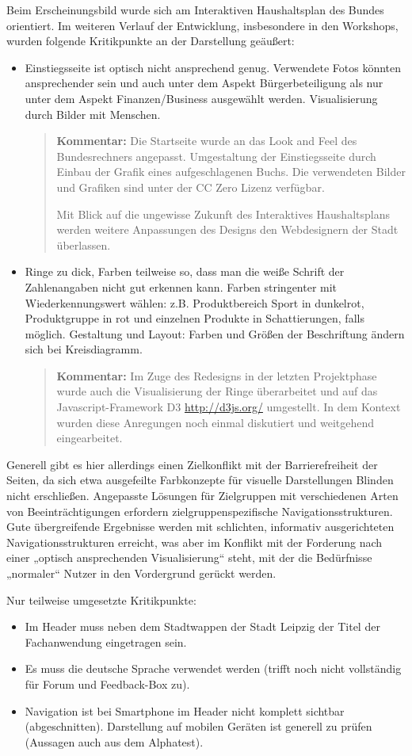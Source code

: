 \documentclass[11pt,a4paper,twoside]{article}
\newcommand{\kommentar}[1]{\begin{quote}\textbf{Kommentar:} #1 \end{quote}}
\begin{document}
Beim Erscheinungsbild wurde sich am Interaktiven Haushaltsplan des Bundes
orientiert. Im weiteren Verlauf der Entwicklung, insbesondere in den
Workshops, wurden folgende Kritikpunkte an der Darstellung geäußert:
\begin{itemize}\itemsep0pt
\item Einstiegsseite ist optisch nicht ansprechend genug.  Verwendete Fotos
  könnten ansprechender sein und auch unter dem Aspekt Bürgerbeteiligung als
  nur unter dem Aspekt Finanzen/Business ausgewählt werden.  Visualisierung
  durch Bilder mit Menschen. 

\kommentar{Die Startseite wurde an das Look and Feel des Bundesrechners
  angepasst. Umgestaltung der Einstiegsseite durch Einbau der Grafik eines
  aufgeschlagenen Buchs.  Die verwendeten Bilder und Grafiken sind unter der
  CC Zero Lizenz verfügbar.

  Mit Blick auf die ungewisse Zukunft des Interaktives Haushaltsplans werden
  weitere Anpassungen des Designs den Webdesignern der Stadt überlassen. }

\item Ringe zu dick, Farben teilweise so, dass man die weiße Schrift der
  Zahlenangaben nicht gut erkennen kann. Farben stringenter mit
  Wiederkennungswert wählen: z.B. Produktbereich Sport in dunkelrot,
  Produktgruppe in rot und einzelnen Produkte in Schattierungen, falls
  möglich.  Gestaltung und Layout: Farben und Größen der Beschriftung ändern
  sich bei Kreisdiagramm.

\kommentar{Im Zuge des Redesigns in der letzten Projektphase wurde auch die
  Visualisierung der Ringe überarbeitet und auf das Javascript-Framework D3
  \url{http://d3js.org/} umgestellt.  In dem Kontext wurden diese Anregungen
  noch einmal diskutiert und weitgehend eingearbeitet.}
\end{itemize}
Generell gibt es hier allerdings einen Zielkonflikt mit der Barrierefreiheit
der Seiten, da sich etwa ausgefeilte Farbkonzepte für visuelle Darstellungen
Blinden nicht erschließen.  Angepasste Lösungen für Zielgruppen mit
verschiedenen Arten von Beeinträchtigungen erfordern zielgruppenspezifische
Navigationsstrukturen.  Gute übergreifende Ergebnisse werden mit schlichten,
informativ ausgerichteten Navigationsstrukturen erreicht, was aber im Konflikt
mit der Forderung nach einer „optisch ansprechenden Visualisierung“ steht, mit
der die Bedürfnisse „normaler“ Nutzer in den Vordergrund gerückt werden.

Nur teilweise umgesetzte Kritikpunkte:
\begin{itemize}\itemsep0pt
\item Im Header muss neben dem Stadtwappen der Stadt Leipzig der Titel der
Fachanwendung eingetragen sein. 
\item Es muss die deutsche Sprache verwendet werden (trifft noch nicht
  vollständig für Forum und Feedback-Box zu).
\item Navigation ist bei Smartphone im Header nicht komplett sichtbar
  (abgeschnitten). Darstellung auf mobilen Geräten ist generell zu prüfen
  (Aussagen auch aus dem Alphatest). 
\end{itemize}
\end{document}
